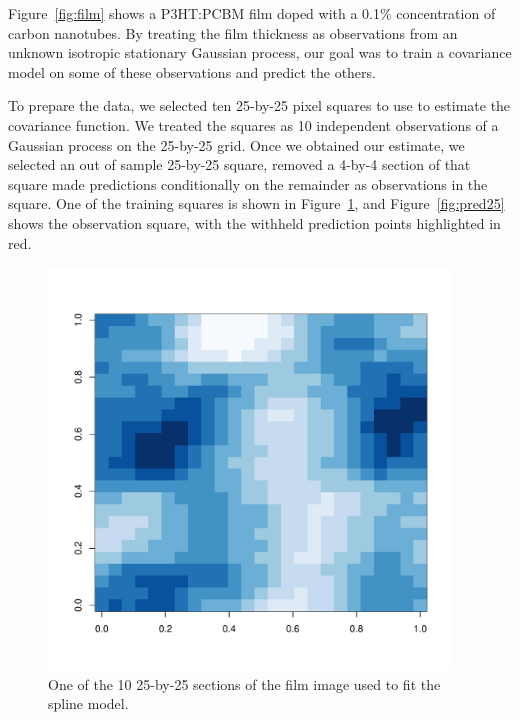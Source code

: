 \documentclass[12pt]{article}
\begin{document}
Figure~\ref{fig:film} shows a P3HT:PCBM film doped with a 0.1\% concentration of carbon nanotubes. By treating the film thickness as observations from an unknown isotropic stationary Gaussian process, our goal was to train a covariance model on some of these observations and predict the others.

To prepare the data, we selected ten 25-by-25 pixel squares to use to estimate the covariance function. We treated the squares as 10 independent observations of a Gaussian process on the 25-by-25 grid. Once we obtained our estimate, we selected an out of sample 25-by-25 square, removed a 4-by-4 section of that square made predictions conditionally on the remainder as observations in the square. One of the training squares is shown in Figure~\ref{fig:training25}, and Figure~\ref{fig:pred25} shows the observation square, with the withheld prediction points highlighted in red.

\begin{figure}[htbp]
  \centering
  \includegraphics[width=0.95\textwidth]{col_image_5.pdf}
  \caption{One of the 10 25-by-25 sections of the film image used to fit the spline model.}
  \label{fig:training25}
\end{figure}
\end{document}
